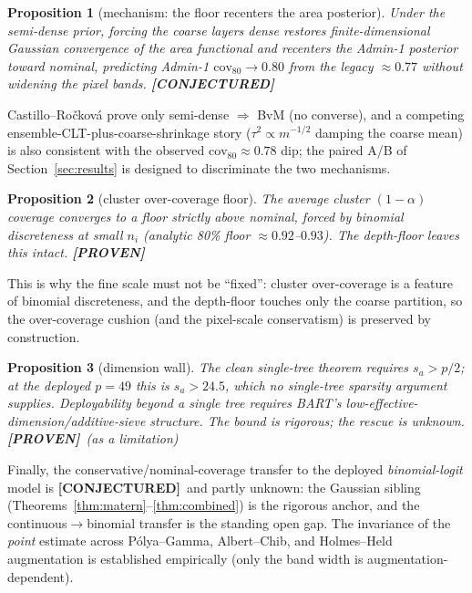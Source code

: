 \documentclass[11pt]{article}
\newtheorem{proposition}{Proposition}
\theoremstyle{remark}
\newcommand{\PROVEN}{\textnormal{\textbf{\textcolor{green!45!black}{[PROVEN]}}}}
\newcommand{\CONJ}{\textnormal{\textbf{\textcolor{orange!75!black}{[CONJECTURED]}}}}
\newcommand{\cov}{\mathrm{cov}}
\begin{document}
\begin{proposition}[mechanism: the floor recenters the area posterior]\label{prop:mech}
Under the semi-dense prior, forcing the coarse layers dense restores
finite-dimensional Gaussian convergence of the area functional and recenters the
Admin-1 posterior toward nominal, predicting Admin-1 $\cov_{80}\to 0.80$ from the
legacy $\approx0.77$ without widening the pixel bands. \CONJ
\end{proposition}

\noindent Castillo--Ro\v{c}kov\'a prove only semi-dense $\Rightarrow$ BvM (no
converse), and a competing ensemble-CLT-plus-coarse-shrinkage story ($\tau^2
\propto m^{-1/2}$ damping the coarse mean) is also consistent with the observed
$\cov_{80}\approx0.78$ dip; the paired A/B of Section~\ref{sec:results} is designed
to discriminate the two mechanisms.

\begin{proposition}[cluster over-coverage floor]\label{prop:clusterfloor}
The average cluster $(1-\alpha)$ coverage converges to a floor strictly above
nominal, forced by binomial discreteness at small $n_i$ (analytic 80\% floor
$\approx 0.92$--$0.93$). The depth-floor leaves this intact. \PROVEN
\end{proposition}

This is why the fine scale must not be ``fixed'': cluster over-coverage is a
feature of binomial discreteness, and the depth-floor touches only the coarse
partition, so the over-coverage cushion (and the pixel-scale conservatism) is
preserved by construction.

\begin{proposition}[dimension wall]\label{prop:dimwall}
The clean single-tree theorem requires $s_a > p/2$; at the deployed $p=49$ this is
$s_a>24.5$, which no single-tree sparsity argument supplies. Deployability beyond a
single tree requires BART's low-effective-dimension/additive-sieve structure. The
bound is rigorous; the rescue is unknown. \PROVEN\ (as a limitation)
\end{proposition}

Finally, the conservative/nominal-coverage transfer to the deployed
\emph{binomial-logit} model is \CONJ\ and partly unknown: the Gaussian sibling
(Theorems~\ref{thm:matern}--\ref{thm:combined}) is the rigorous anchor, and the
continuous$\to$binomial transfer is the standing open gap. The invariance of the
\emph{point} estimate across P\'olya--Gamma, Albert--Chib, and Holmes--Held
augmentation is established empirically (only the band width is
augmentation-dependent).
\end{document}
